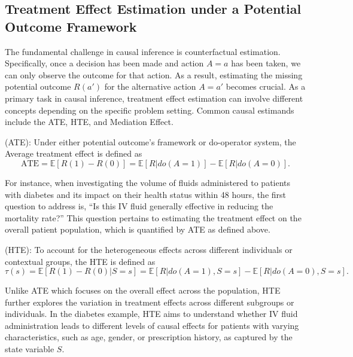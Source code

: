 \subsection{Treatment Effect Estimation under a Potential Outcome Framework}

The fundamental challenge in causal inference is counterfactual estimation. Specifically, once a decision has been made and action $A=a$ has been taken, we can only observe the outcome for that action. As a result, estimating the missing potential outcome $R(a')$ for the alternative action $A=a'$ becomes crucial. As a primary task in causal inference, treatment effect estimation can involve different concepts depending on the specific problem setting. Common causal estimands include the \acrfull{ATE}, \acrfull{HTE}, and Mediation Effect. 
\begin{definition} (\acrshort{ATE}): Under either potential outcome's framework or do-operator system, the Average treatment effect is defined as
        \begin{equation*}
    \text{ATE} = \mathbb{E}[R(1) - R(0)] = \mathbb{E}[ R|do(A=1)] -  \mathbb{E}[ R|do(A=0)].
    \end{equation*}
\end{definition}

For instance, when investigating the volume of fluids administered to patients with diabetes and its impact on their health status within 48 hours, the first question to address is, ``Is this IV fluid generally effective in reducing the mortality rate?'' This question pertains to estimating the treatment effect on the overall patient population, which is quantified by ATE as defined above.

\begin{definition} (\acrshort{HTE}): To account for the heterogeneous effects across different individuals or contextual groups, the HTE is defined as
    \begin{equation*}
    \tau(s) = \mathbb{E}[R(1) - R(0)|S=s] = \mathbb{E}[ R|do(A=1),S=s] -  \mathbb{E}[ R|do(A=0),S=s].
    \end{equation*}
\end{definition}
Unlike ATE which focuses on the overall effect across the population, HTE further explores the variation in treatment effects across different subgroups or individuals. In the diabetes example, HTE aims to understand whether IV fluid administration leads to different levels of causal effects for patients with varying characteristics, such as age, gender, or prescription history, as captured by the state variable $S$.

